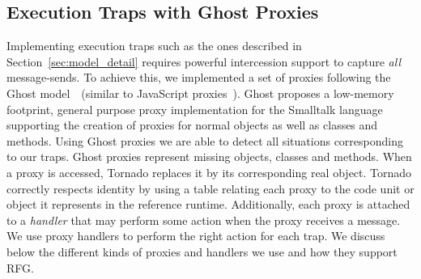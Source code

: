 \subsection{Execution Traps with Ghost Proxies} \label{sec:proxies}

Implementing execution traps such as the ones described in Section~\ref{sec:model_detail} requires powerful intercession support to capture \emph{all} message-sends.%
To achieve this, we implemented a set of proxies following the Ghost model~\cite{Mart14z}~(similar to JavaScript proxies~\cite{Vanc10a}). Ghost proposes a low-memory footprint, general purpose proxy implementation for the Smalltalk language supporting the creation of proxies for normal objects as well as classes and methods. 
Using Ghost proxies we are able to detect all situations corresponding to our traps.
Ghost proxies represent missing objects, classes and methods. When a proxy is accessed, Tornado replaces it by its corresponding real object.
Tornado correctly respects identity by using a table relating each proxy to the code unit or object it represents in the reference runtime.
Additionally, each proxy is attached to a \emph{handler} that may perform some action when the proxy receives a message.
We use proxy handlers to perform the right action for each trap.
We discuss below the different kinds of proxies and handlers we use and how they support RFG.

